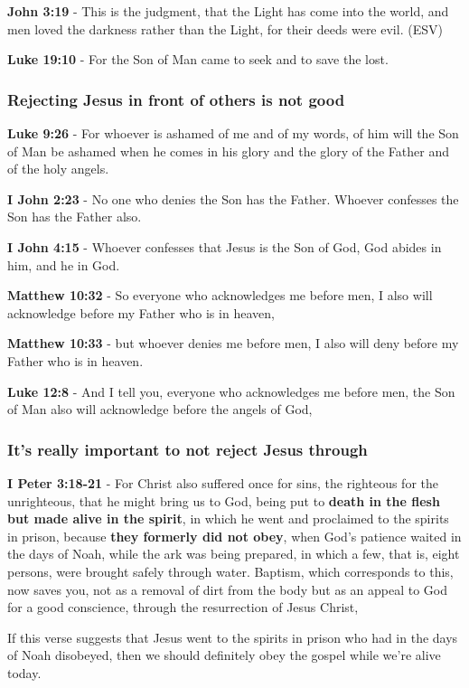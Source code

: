 \documentclass[11pt]{article}
\begin{document}
\textbf{John 3:19} - This is the judgment, that the Light has come into the world, and men loved the darkness rather than the Light, for their deeds were evil. (ESV)

\textbf{Luke 19:10} - For the Son of Man came to seek and to save the lost.

\subsubsection{Rejecting Jesus in front of others is not good}
\label{sec:org2626478}
\textbf{Luke 9:26} - For whoever is ashamed of me and of my words, of him will the Son of Man be ashamed when he comes in his glory and the glory of the Father and of the holy angels.

\textbf{I John 2:23} - No one who denies the Son has the Father. Whoever confesses the Son has the Father also.

\textbf{I John 4:15} - Whoever confesses that Jesus is the Son of God, God abides in him, and he in God.

\textbf{Matthew 10:32} - So everyone who acknowledges me before men, I also will acknowledge before my Father who is in heaven,

\textbf{Matthew 10:33} - but whoever denies me before men, I also will deny before my Father who is in heaven.

\textbf{Luke 12:8} - And I tell you, everyone who acknowledges me before men, the Son of Man also will acknowledge before the angels of God,

\subsubsection{It's \textbf{really} important to not reject Jesus through}
\label{sec:orgab464d0}

\textbf{I Peter 3:18-21} - For Christ also suffered once for sins, the righteous for the unrighteous, that he might bring us to God, being put to \textbf{death in the flesh but made alive in the spirit}, in which he went and proclaimed to the spirits in prison, because \textbf{they formerly did not obey}, when God's patience waited in the days of Noah, while the ark was being prepared, in which a few, that is, eight persons, were brought safely through water. Baptism, which corresponds to this, now saves you, not as a removal of dirt from the body but as an appeal to God for a good conscience, through the resurrection of Jesus Christ,

If this verse suggests that Jesus went to the spirits in prison who had in the days of Noah disobeyed, then we should definitely obey the gospel while we're alive today.
\end{document}
